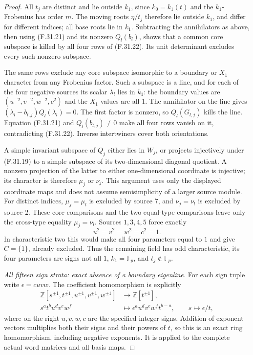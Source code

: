 \begin{proof}
All $t_j$ are distinct and lie outside
$k_1$, since $k_0=k_1(t)$ and the
$k_1$-Frobenius has order $m$.
The moving roots $\eta/t_j$ therefore
lie outside $k_1$, and differ for
different indices; all base roots lie
in $k_1$. Subtracting the annihilators
as above, then using (F.31.21) and its
nonzero $Q_l(b_l)$, shows that a common
core subspace is killed by all four
rows of (F.31.22). Its unit determinant
excludes every such nonzero subspace.

The same rows exclude any core subspace
isomorphic to a boundary or $X_1$
character from any Frobenius factor.
Such a subspace is a line, and for
each of the four negative sources its
scalar $\lambda_l$ lies in $k_1$:
the boundary values are
$(u^{-2},v^{-2},w^{-2},c^2)$ and
the $X_1$ values are all $1$.
The annihilator on the line gives
$(\lambda_l-b_{l,j})Q_l(\lambda_l)=0$.
The first factor is nonzero, so
$Q_l(G_{l,j})$ kills the line.
Equation (F.31.21) and $Q_l(b_{l,j})\ne0$
make all four rows vanish on it,
contradicting (F.31.22).
Inverse intertwiners cover both orientations.

A simple invariant subspace of $Q_j$
either lies in $W_j$, or projects
injectively under (F.31.19) to a simple
subspace of its two-dimensional diagonal
quotient. A nonzero projection of the
latter to either one-dimensional
coordinate is injective; its character
is therefore $\mu_j$ or $\nu_j$.
This argument uses only the displayed
coordinate maps and does not assume
semisimplicity of a larger source module.
For distinct indices, $\mu_j=\mu_l$
is excluded by source $7$, and
$\nu_j=\nu_l$ is excluded by source $2$.
These core comparisons and the two
equal-type comparisons leave only
the cross-type equality
$\mu_j=\nu_l$.
Sources $1,3,4,5$ force exactly
\[
                  u^2=v^2=w^2=c^2=1.
                                                               \tag{F.31.23}
\]
In characteristic two this would make
all four parameters equal to $1$ and
give $C=\{1\}$, already excluded.
Thus the remaining field has odd
characteristic, its four parameters
are signs not all $1$, $k_1=\mathbb F_p$,
and $t_j\notin\mathbb F_p$.

\emph{All fifteen sign strata: exact absence of a boundary eigenline.}
For each sign tuple write
$\epsilon=cuvw$.
The coefficient homomorphism is explicitly
\[
 \begin{aligned}
 \mathbb Z[s^{\pm1},t^{\pm1},u^{\pm1},v^{\pm1},w^{\pm1}]
    &\longrightarrow\mathbb Z[t^{\pm1}],\\
 s^at^bu^dv^ew^f
    &\longmapsto\epsilon^a u^dv^ew^f t^{b-a},
       \qquad s\longmapsto\epsilon/t,
 \end{aligned}                                                \tag{F.31.24}
\]
where on the right $u,v,w,c$ are the
specified integer signs.
Addition of exponent vectors multiplies
both their signs and their powers of
$t$, so this is an exact ring
homomorphism, including negative exponents.
It is applied to the complete actual
word matrices and all basis maps.


\end{proof}
